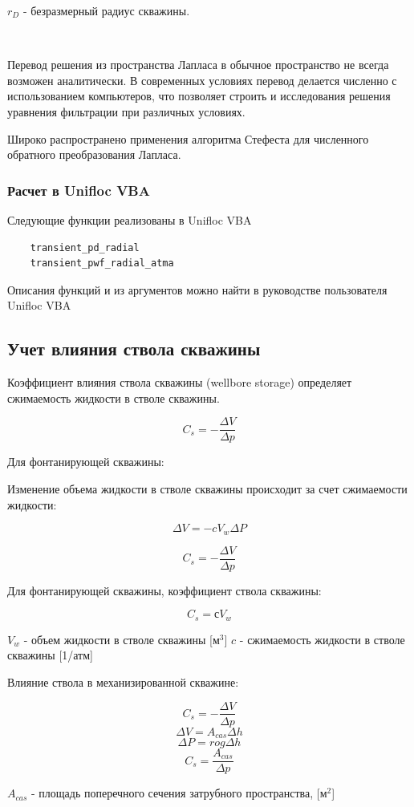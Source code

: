 $r_D$ - безразмерный радиус скважины.

\

Перевод решения из пространства Лапласа в обычное пространство не всегда возможен аналитически. В современных условиях перевод делается численно с использованием компьютеров, что позволяет строить и исследования решения уравнения фильтрации при различных условиях. 

Широко распространено применения алгоритма Стефеста для численного обратного преобразования Лапласа. 

\subsubsection{Расчет в Unifloc VBA}

Следующие функции реализованы в Unifloc VBA

\begin{verbatim}
	transient_pd_radial
	transient_pwf_radial_atma
\end{verbatim}	

Описания функций и из аргументов можно найти в руководстве пользователя  Unifloc VBA

\subsection{Учет влияния ствола скважины}
Коэффициент влияния ствола скважины (wellbore storage) определяет сжимаемость жидкости в стволе скважины.


$$ C_s = - \frac{ \Delta V}{ \Delta p} $$

Для фонтанирующей скважины:

Изменение объема жидкости в стволе скважины происходит за счет сжимаемости жидкости:

$$ \Delta V = -c{V_w}{\Delta P} $$

$$ C_s = - \frac{ \Delta V}{ \Delta p} $$

Для фонтанирующей скважины, коэффициент ствола скважины:

$$ C_s =  с {V_w} $$

$ V_w $ - объем жидкости в стволе скважины  [м$^3$]
$c$ - сжимаемость жидкости в стволе скважины [1/атм]

Влияние ствола в механизированной скважине:

$$ C_s = - \frac{ \Delta V}{ \Delta p} $$
$$ {\Delta V} = A_{cas}{\Delta h} $$
$$ {\Delta P} ={ro g}{\Delta h}$$
$$ C_s =  \frac{ A_{cas}}{ \Delta p} $$

$ A_{cas}$ - площадь поперечного сечения затрубного пространства, [м$^2$]


